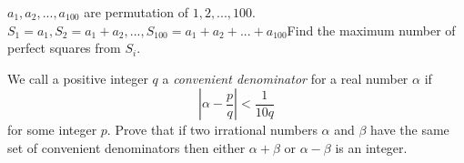 \documentclass[problems.tex]{subfile}
\begin{document}
	
	
	
	\begin{problem}
		$a_1,a_2,...,a_{100}$ are permutation of $1,2,...,100$. $S_1=a_1, S_2=a_1+a_2,...,S_{100}=a_1+a_2+...+a_{100}$Find the maximum number of perfect squares from $S_i$. %
	\end{problem}
	
	
	
	
	\begin{problem}
		We call a positive integer $q$ a \textit{convenient denominator} for a real number $\alpha$ if
		$$\displaystyle \left|\alpha - \dfrac{p}{q}\right|<\dfrac{1}{10q}$$ for some integer $p$. Prove that if two irrational numbers $\alpha$ and
		$\beta$ have the same set of convenient denominators then either $\alpha+\beta$ or $\alpha- \beta$ is an integer\watermark. %
	\end{problem}
	
	
\end{document}
